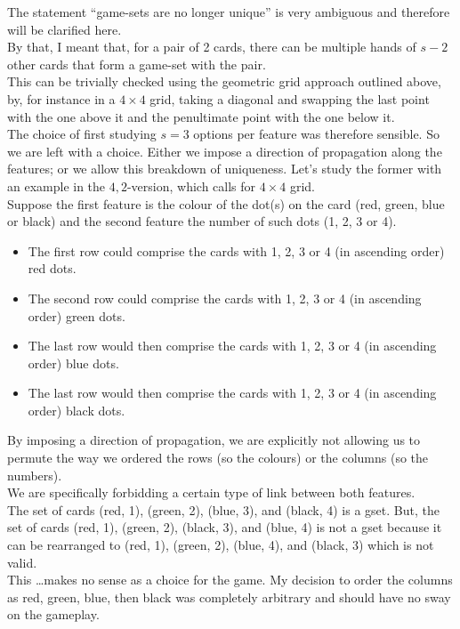 \documentclass{article}
\theoremstyle{definition}
\theoremstyle{remark}
\begin{document}
The statement ``game-sets are no longer unique'' is very ambiguous and therefore will be clarified here.\\
By that, I meant that, for a pair of 2 cards, there can be multiple hands of $s-2$ other cards that form a game-set with the pair. \\
This can be trivially checked using the geometric grid approach outlined above, by, for instance in a $4\times4$ grid, taking a diagonal and swapping the last point with the one above it and the penultimate point with the one below it.\\
The choice of first studying $s=3$ options per feature was therefore sensible.
\medbreak
So we are left with a choice. Either we impose a direction of propagation along the features; or we allow this breakdown of uniqueness.
\smallbreak
Let's study the former with an example in the $4,2$-version, which calls for $4\times4$ grid.\\
Suppose the first feature is the colour of the dot(s) on the card (red, green, blue or black) and the second feature the number of such dots (1, 2, 3 or 4). 
\begin{itemize}
    \item The first row could comprise the cards with 1, 2, 3 or 4 (in ascending order) red dots.
    \item The second row could comprise the cards with 1, 2, 3 or 4 (in ascending order) green dots.
    \item The last row would then comprise the cards with 1, 2, 3 or 4 (in ascending order) blue dots.
    \item The last row would then comprise the cards with 1, 2, 3 or 4 (in ascending order) black dots.
\end{itemize}
By imposing a direction of propagation, we are explicitly not allowing us to permute the way we ordered the rows (so the colours) or the columns (so the numbers).\\
We are specifically forbidding a certain type of link between both features.\\
The set of cards (red, 1), (green, 2), (blue, 3), and (black, 4) is a gset. But, the set of cards (red, 1), (green, 2), (black, 3), and (blue, 4) is not a gset because it can be rearranged to (red, 1), (green, 2), (blue, 4), and (black, 3) which is not valid.\\
This \dots makes no sense as a choice for the game. My decision to order the columns as red, green, blue, then black was completely arbitrary and should have no sway on the gameplay. \\
\end{document}
